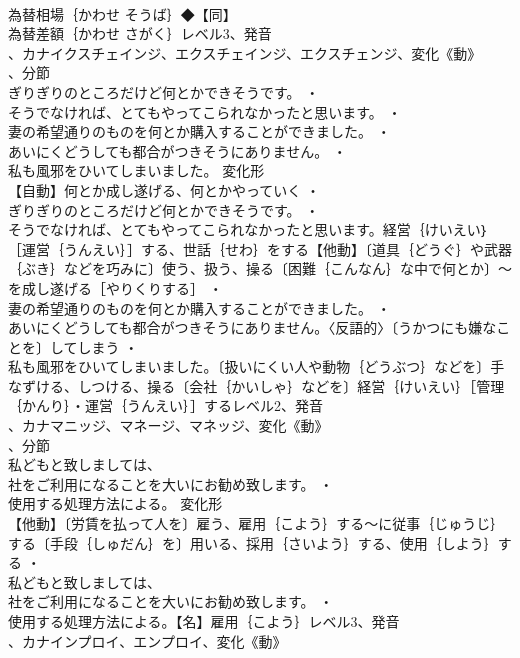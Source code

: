 \documentclass[8pt]{extreport}
\begin{document}
\begin{CJK}{UTF8}{min}
\\	為替相場｛かわせ そうば｝◆【同】
\\	為替差額｛かわせ さがく｝レベル3、発音
\\	、カナイクスチェインジ、エクスチェインジ、エクスチェンジ、変化《動》
\\	、分節
\\	ぎりぎりのところだけど何とかできそうです。 ・
\\	そうでなければ、とてもやってこられなかったと思います。 ・
\\	妻の希望通りのものを何とか購入することができました。 ・
\\	あいにくどうしても都合がつきそうにありません。 ・
\\	私も風邪をひいてしまいました。	変化形 
\\	【自動】何とか成し遂げる、何とかやっていく ・
\\	ぎりぎりのところだけど何とかできそうです。 ・
\\	そうでなければ、とてもやってこられなかったと思います。経営｛けいえい｝［運営｛うんえい｝］する、世話｛せわ｝をする【他動】〔道具｛どうぐ｝や武器｛ぶき｝などを巧みに〕使う、扱う、操る〔困難｛こんなん｝な中で何とか〕～を成し遂げる［やりくりする］ ・
\\	妻の希望通りのものを何とか購入することができました。 ・
\\	あいにくどうしても都合がつきそうにありません。〈反語的〉〔うかつにも嫌なことを〕してしまう ・
\\	私も風邪をひいてしまいました。〔扱いにくい人や動物｛どうぶつ｝などを〕手なずける、しつける、操る〔会社｛かいしゃ｝などを〕経営｛けいえい｝［管理｛かんり｝・運営｛うんえい｝］するレベル2、発音
\\	、カナマニッジ、マネージ、マネッジ、変化《動》
\\	、分節
\\	私どもと致しましては、
\\	社をご利用になることを大いにお勧め致します。 ・
\\	使用する処理方法による。	変化形 
\\	【他動】〔労賃を払って人を〕雇う、雇用｛こよう｝する～に従事｛じゅうじ｝する〔手段｛しゅだん｝を〕用いる、採用｛さいよう｝する、使用｛しよう｝する ・
\\	私どもと致しましては、
\\	社をご利用になることを大いにお勧め致します。 ・
\\	使用する処理方法による。【名】雇用｛こよう｝レベル3、発音
\\	、カナインプロイ、エンプロイ、変化《動》

\end{CJK}
\end{document}

